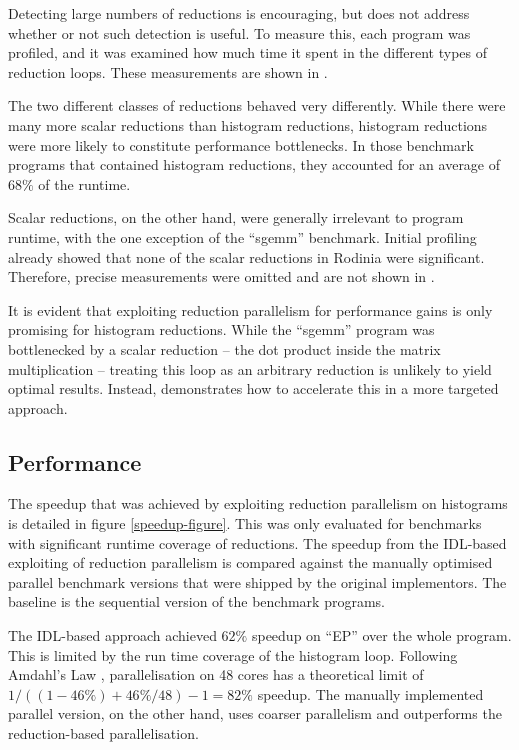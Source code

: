     Detecting large numbers of reductions is encouraging, but does not address
    whether or not such detection is useful.
    To measure this, each program was profiled, and it was examined how much
    time it spent in the different types of reduction loops.
    These measurements are shown in
    .

    The two different classes of reductions behaved very differently.
    While there were many more scalar reductions than histogram reductions,
    histogram reductions were  more likely to constitute performance
    bottlenecks.
    In those benchmark programs that contained histogram reductions,
    they accounted for an average of $68\%$ of the runtime.

    Scalar reductions, on the other hand, were generally irrelevant to program
    runtime, with the one exception of the ``sgemm'' benchmark.
    Initial profiling already showed that none of the scalar reductions in
    Rodinia were significant.
    Therefore, precise measurements were omitted and are not shown in
    .

    It is evident that exploiting reduction parallelism for performance gains
    is only promising for histogram reductions.
    While the ``sgemm'' program was bottlenecked by a scalar reduction -- the
    dot product inside the matrix multiplication -- treating this loop as an
    arbitrary reduction is unlikely to yield optimal results.
    Instead,  demonstrates how to accelerate this in a more
    targeted approach.

\subsection{Performance}

    The speedup that was achieved by exploiting reduction parallelism on
    histograms is detailed in figure \ref{speedup-figure}.
    This was only evaluated for benchmarks with significant runtime coverage of
    reductions.
    The speedup from the IDL-based exploiting of reduction parallelism
    is compared against the manually optimised parallel benchmark versions that
    were shipped by the original implementors.
    The baseline is the sequential version of the benchmark programs.

    The IDL-based approach achieved $62\%$ speedup on ``EP'' over the whole
    program.
    This is limited by the run time coverage of the histogram loop.
    Following Amdahl's Law
    \citep{Amdahl:1967:VSP:1465482.1465560,Hill:2008:ALM:1449375.1449387},
    parallelisation on 48 cores has a theoretical limit of
    $1/((1-46\%)+46\%/48)-1=82\%$ speedup.
    The manually implemented parallel version, on the other hand, uses coarser
    parallelism and outperforms the reduction-based parallelisation.

